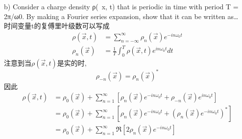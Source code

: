 \documentclass[UTF8,9pt]{ctexart}
\begin{document}
 b) Consider a charge density ρ(~x, t) that is periodic in time with period T = 2π/ω0.
 By making a Fourier series expansion, show that it can be written as\dots\\
 时间变量t的复傅里叶级数可以写成
 $$ 
\begin{aligned} \rho(\vec{x}, t) &=\sum_{n=-\infty}^{\infty} \rho_{n}(\vec{x}) e^{-i n \omega_{0} t} \\ \rho_{n}(\vec{x}) &=\frac{1}{T} \int_{0}^{T} \rho(\vec{x}, t) e^{i n \omega_{0} t} d t \end{aligned}
 $$
注意到当$\rho(\vec{x}, t)$是实的时, 
$$ 
\rho_{-n}(\vec{x})=\rho_{n}(\vec{x})^{*}
 $$
 因此$$ 
\begin{aligned} \rho(\vec{x}, t) &=\rho_{0}(\vec{x})+\sum_{n=1}^{\infty}\left[\rho_{n}(\vec{x}) e^{-i n \omega_{0} t}+\rho_{-n}(\vec{x}) e^{i n \omega_{0} t}\right] \\ &=\rho_{0}(\vec{x})+\sum_{n=1}^{\infty}\left[\rho_{n}(\vec{x}) e^{-i n \omega_{0} t}+\left(\rho_{n}(\vec{x}) e^{-i n \omega_{0} t}\right)^{*}\right] \\ &=\rho_{0}(\vec{x})+\sum_{n=1}^{\infty} \Re\left[2 \rho_{n}(\vec{x}) e^{-i n \omega_{0} t}\right] \end{aligned}
 $$
\end{document}
